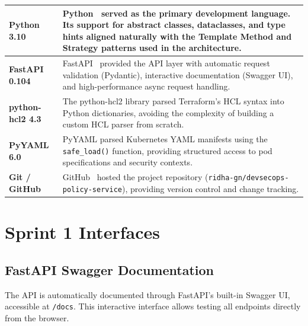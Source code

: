 \vspace{0.5cm}
\begin{tabular}{| m{2.5cm} | m{10cm} |}
\hline

\textbf{Python 3.10} &
Python~\cite{python} served as the primary development language. Its support for abstract classes, dataclasses, and type hints aligned naturally with the Template Method and Strategy patterns used in the architecture.
\\
\hline

\textbf{FastAPI 0.104} &
FastAPI~\cite{fastapi} provided the API layer with automatic request validation (Pydantic), interactive documentation (Swagger UI), and high-performance async request handling.
\\
\hline

\textbf{python-hcl2 4.3} &
The python-hcl2 library parsed Terraform's HCL syntax into Python dictionaries, avoiding the complexity of building a custom HCL parser from scratch.
\\
\hline

\textbf{PyYAML 6.0} &
PyYAML parsed Kubernetes YAML manifests using the \texttt{safe\_load()} function, providing structured access to pod specifications and security contexts.
\\
\hline

\textbf{Git / GitHub} &
GitHub~\cite{github} hosted the project repository (\texttt{ridha-gn/devsecops-policy-service}), providing version control and change tracking.
\\
\hline

\end{tabular}

\section{Sprint 1 Interfaces}

\subsection{FastAPI Swagger Documentation}

The API is automatically documented through FastAPI's built-in Swagger UI, accessible at \texttt{/docs}. This interactive interface allows testing all endpoints directly from the browser.

